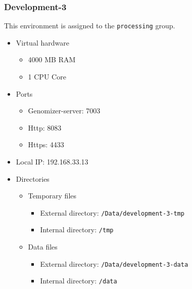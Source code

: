 \subsubsection{Development-3}\label{development-3}

This environment is assigned to the \texttt{processing} group.

\begin{itemize}
\itemsep1pt\parskip0pt
\item
  Virtual hardware

  \begin{itemize}
  \itemsep1pt\parskip0pt
  \item
    4000 MB RAM
  \item
    1 CPU Core
  \end{itemize}
\item
  Ports

  \begin{itemize}
  \itemsep1pt\parskip0pt
  \item
    Genomizer-server: 7003
  \item
    Http: 8083
  \item
    Https: 4433
  \end{itemize}
\item
  Local IP: 192.168.33.13
\item
  Directories

  \begin{itemize}
  \itemsep1pt\parskip0pt
  \item
    Temporary files

    \begin{itemize}
    \itemsep1pt\parskip0pt
    \item
      External directory: \texttt{/Data/development-3-tmp}
    \item
      Internal directory: \texttt{/tmp}
    \end{itemize}
  \item
    Data files

    \begin{itemize}
    \itemsep1pt\parskip0pt
    \item
      External directory: \texttt{/Data/development-3-data}
    \item
      Internal directory: \texttt{/data}
    \end{itemize}
  \end{itemize}
\end{itemize}

